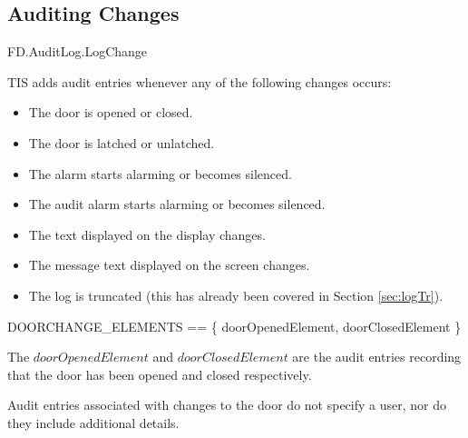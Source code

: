 \subsection{Auditing Changes}

\begin{traceunit}{FD.AuditLog.LogChange}
\end{traceunit}


TIS adds audit entries whenever any of the following changes occurs:
\begin{itemize}
\item
The door is opened or closed.
\item
The door is latched or unlatched.
\item
The alarm starts alarming or becomes silenced.
\item
The audit alarm  starts alarming or becomes silenced.
\item
The text displayed on the display changes.
\item
The message text displayed on the screen changes.
\item
The log is truncated (this has already been covered in Section
\ref{sec:logTr}). 
\end{itemize}

\begin{zed}
DOORCHANGE\_ELEMENTS == \{ doorOpenedElement, doorClosedElement \}
\end{zed}
\begin{Zcomment}
\item
The $doorOpenedElement$ and $doorClosedElement$ are the audit entries recording that the door has
been opened and closed respectively.
\end{Zcomment}

Audit entries associated with changes to the door do not specify a
user, nor do they include additional details.

